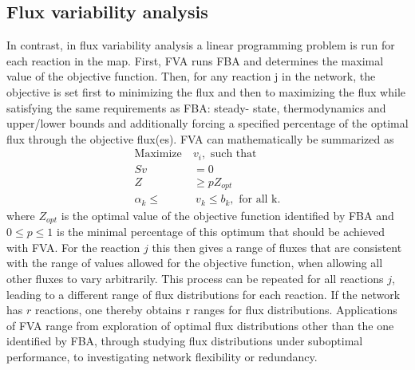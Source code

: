 \documentclass{article}
\begin{document}
\subsection*{Flux variability analysis}
In contrast, in flux variability analysis \cite{Gudmundsson2010,Mahadevan2003} a linear programming problem is run for each reaction in the map. First, FVA runs FBA and determines the maximal value of the objective function. Then, for any reaction j in the network, the objective is set first to minimizing the flux and then to maximizing the flux while satisfying the same requirements as FBA: steady-
state, thermodynamics and upper/lower bounds and additionally forcing a specified percentage of the optimal flux through the objective flux(es). FVA can mathematically be summarized as
\begin{align*}
\text{Maximize} ~ &v_i, \text{ such that } \\
Sv &= 0 \\
Z &\geq p Z_{opt} \\
\alpha_k \leq & ~ v_k \leq b_k, \text{ for all k}.
\end{align*}
where $Z_{opt}$ is the optimal value of the objective function identified by FBA and $0 \leq p \leq 1$ is the minimal percentage of this optimum that should be achieved with FVA. For the reaction $j$ this then gives a range of fluxes that are consistent with the range of values allowed for the objective function, when allowing all other fluxes to vary arbitrarily. This process can be repeated for all reactions $j$, leading to a different range of flux distributions for each reaction. If the network has $r$ reactions, one thereby obtains r ranges for flux distributions. Applications of FVA range from exploration of optimal flux distributions other than the one identified by FBA, through studying flux distributions under suboptimal performance, to investigating network flexibility or redundancy.
\end{document}

